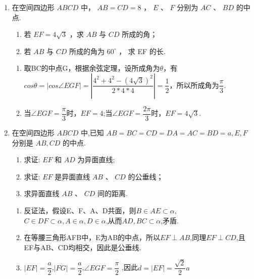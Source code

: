 \begin{enumerate}
\item 在空间四边形 ${ABCD}$ 中， ${AB} = {CD} = 8$ ， $E$ 、 $F$ 分别为 ${AC}$ 、 ${BD}$ 的中点.

\begin{enumerate}
    \item 若 ${EF} = {4\sqrt{3}}$ ，求 ${AB}$ 与 ${CD}$ 所成的角；
    \item 若 ${AB}$ 与 ${CD}$ 所成的角为 ${60}^{ \circ  }$ ， 求 EF 的长.
\end{enumerate}

\begin{jieda}
    \begin{enumerate}
        \item 取BC的中点G，根据余弦定理，设所成角为$\theta$，有$cos\theta=|cos\angle{EGF}|=|\dfrac{4^2+4^2-(4\sqrt{3})^2}{2*4*4}|=\dfrac{1}{2}$，所以所成角为$\dfrac{\pi}{3}$.
        \item 当$\angle{EGF=\dfrac{\pi}{3}}$时，$EF=4$;当$\angle{EGF=\dfrac{2\pi}{3}}$时，$EF=4\sqrt{3}$.
    \end{enumerate}
\end{jieda}

\item 在空间四边形 ${ABCD}$ 中,已知 ${AB} = {BC} = {CD} = {DA} = {AC} = {BD} = a,E,F$ 分别是 ${AB},{CD}$ 的中点. 
\begin{enumerate}
    \item 求证: ${EF}$ 和 ${AD}$ 为异面直线;
    \item 求证: ${EF}$ 是异面直线 ${AB}$ 、 ${CD}$ 的公垂线；
    \item 求异面直线 ${AB}$ 、 ${CD}$ 间的距离.
\end{enumerate}

\begin{jieda}
    \begin{enumerate}
        \item 反证法，假设E、F、A、D共面，则$B\in AE\subset \alpha$,$C\in DF\subset \alpha, A\in \alpha, D\in \alpha$,从而$AD,BC\subset \alpha$,矛盾.
        \item 在等腰三角形AFB中，E为AB的中点，所以$EF\perp AB$,同理$EF\perp CD$,且EF与AB、CD均相交，因此是公垂线.

        \item $|EF|=\dfrac{a}{2}$,$|FG|=\dfrac{a}{2}$,$\angle{EGF}=\dfrac{\pi}{2}$ ,因此$d=|EF|=\dfrac{\sqrt{2}}{2}a$
    \end{enumerate}
\end{jieda}




\end{enumerate}
